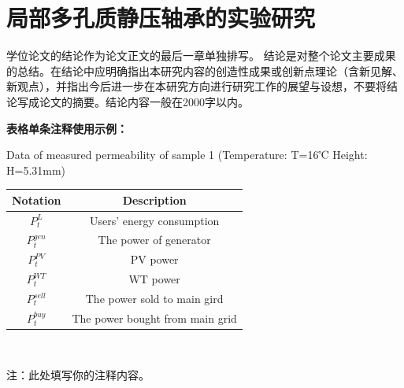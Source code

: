 \chapter{局部多孔质静压轴承的实验研究}

学位论文的结论作为论文正文的最后一章单独排写。
结论是对整个论文主要成果的总结。在结论中应明确指出本研究内容的创造性成果或创新点理论（含新见解、新观点），并指出今后进一步在本研究方向进行研究工作的展望与设想，不要将结论写成论文的摘要。结论内容一般在2000字以内。

\textbf{表格单条注释使用示例：}
\begin{table}[htbp]
{Data of measured permeability of sample 1 (Temperature: T=16℃ Height: H=5.31mm)} %
\label{notation} %
\begin{tabularx}{\textwidth}{ C{0.4} C{0.6}}
    \toprule[1.5pt]
        Notation & Description   \\  
    \midrule[1pt]
        $P_{t}^L$ & Users' energy consumption \\ 
        $P_t^{gen}$ & The power of generator\\
        $P_t^{PV}$ & PV power \\ 
        $P_t^{WT}$ & WT power  \\
        $P_t^{sell}$ & The power sold to main gird \\ 
        $P_t^{buy}$ & The power bought from main grid \\
    \bottomrule[1.5pt]
\end{tabularx}
\\[4pt]  %
\parbox{\textwidth}{\footnotesize 注：此处填写你的注释内容。} %
\end{table}


